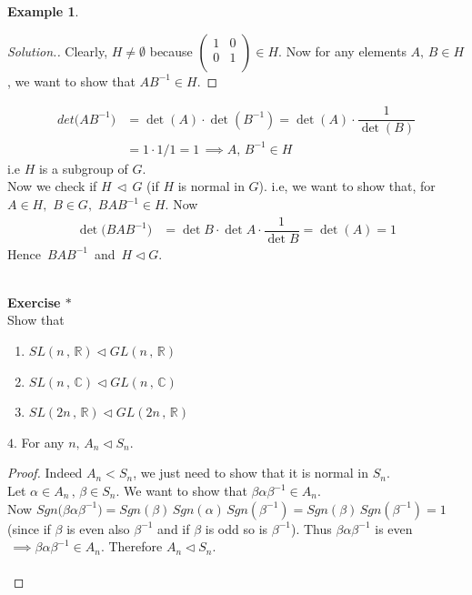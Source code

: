 \documentclass[11pt,a4paper]{article}
\theoremstyle{definition}
\newtheorem{exa}[thm]{Example}
\newenvironment{solution}
  {\renewcommand{\qedsymbol}{}\begin{proof}[\textit{Solution}.]}
  {\end{proof}}
\begin{document}
\begin{exa}
\begin{enumerate}
\begin{solution}
Clearly, $H\neq \emptyset$ because $\begin{pmatrix}
1 & 0\\
0 & 1\\
\end{pmatrix}\in H$. Now for any elements $A, \, B\in H$, we want to show that $AB^{-1}\in H$. 
\end{solution}
\begin{align*}
det\big(AB^{-1}\big)  & = \det(A)\cdot \det (B^{-1})
 = \det(A)\cdot \dfrac{1}{\det(B)}\\
& = 1\cdot 1/1 = 1\, \implies A,\, B^{-1}\in H
\end{align*}
i.e $H$ is a subgroup of $G$.\\
Now we check if $H\,\vartriangleleft\,G$ (if $H$ is normal in $G$). i.e, we want to show that, for $A\in H,\,\, B\in G,\,\, BAB^{-1}\in H$. Now 
\begin{align*}
\det\big(BAB^{-1}\big) & = \det B\cdot \det A\cdot \dfrac{1}{\det B}
 = \det (A) = 1
\end{align*}
Hence $\, BAB^{-1}\, $ and $\, H\lhd G$.\\\\
\end{enumerate}
\end{exa}





\textbf{Exercise $*$}\\
Show that \begin{enumerate}
         \item $SL (n\, ,\, \mathbb{R}) \lhd GL(n\, ,\, \mathbb{R})$
         \item $SL (n\, , \, \mathbb{C})\lhd GL(n\,,\, \mathbb{C})$
         \item $SL (2n\, , \, \mathbb{R})\lhd GL(2n\, , \, \mathbb{R})$\\
\end{enumerate}

 
 
$4.$ For any $n, \, A_n \lhd S_n$.\\

\begin{proof}
Indeed $A_n < S_n$, we just need to show that it is normal in $S_n$.\\
Let $\alpha \in A_n \, ,\, \beta \in S_n$. We want to show that $\beta\alpha \beta^{-1}\in A_n$.\\
Now $Sgn\big(\beta\alpha\beta^{-1}\big) = Sgn(\beta)\, Sgn(\alpha)\, Sgn(\beta^{-1}) = Sgn(\beta)\, Sgn(\beta^{-1}) = 1$ (since if $\beta$ is even also $\beta^{-1}$  and if $\beta$ is odd so is $\beta^{-1}$). Thus $\beta\alpha\beta^{-1}$ is even $\,\implies \beta\alpha\beta^{-1}\in A_n$. Therefore $A_n\lhd S_n$.\\\\ 
\end{proof}
\end{document}
